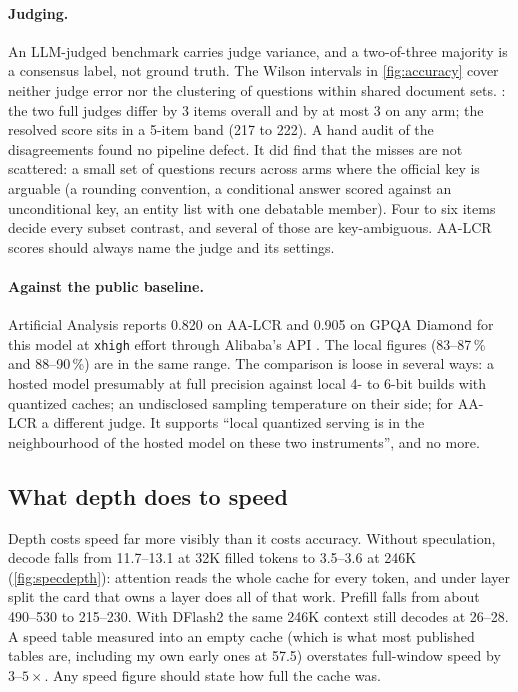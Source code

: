\paragraph{Judging.} An LLM-judged benchmark carries judge variance, and a two-of-three majority is a
consensus label, not ground truth. The Wilson intervals in \cref{fig:accuracy} cover neither judge error
nor the clustering of questions within shared document sets. : the two full
judges differ by 3 items overall and by at most 3 on any arm; the resolved score sits in a 5-item band
(217 to 222). A hand audit of the disagreements found no pipeline defect. It did find that the misses
are not scattered: a small set of questions recurs across arms where the official key is arguable
(a rounding convention, a conditional answer scored against an unconditional key, an entity list with
one debatable member). Four to six items decide every subset contrast, and several of those are
key-ambiguous. AA-LCR scores should always name the judge and its settings.

\paragraph{Against the public baseline.} Artificial Analysis reports 0.820 on AA-LCR and 0.905 on GPQA
Diamond for this model at \texttt{xhigh} effort through Alibaba's API
\citep{artificialanalysis2026qwen38}. The local figures (83--87\,\% and 88--90\,\%) are in the same
range. The comparison is loose in several ways: a hosted model presumably at full precision against
local 4- to 6-bit builds with quantized caches; an undisclosed sampling temperature on their side;
for AA-LCR a different judge. It supports ``local quantized serving is in the neighbourhood of the
hosted model on these two instruments'', and no more.

\subsection{What depth does to speed}
Depth costs speed far more visibly than it costs accuracy. Without speculation, decode falls from
11.7--13.1\tps{} at 32K filled tokens to 3.5--3.6 at 246K (\cref{fig:specdepth}): attention reads the
whole cache for every token, and under layer split the card that owns a layer does all of that work.
Prefill falls from about 490--530\tps{} to 215--230. With DFlash2 the same 246K context still decodes
at 26--28\tps. A speed table measured into an empty cache (which is what most published tables are,
including my own early ones at 57.5\tps{}) overstates full-window speed by $3$--$5\times$. Any speed
figure should state how full the cache was.

